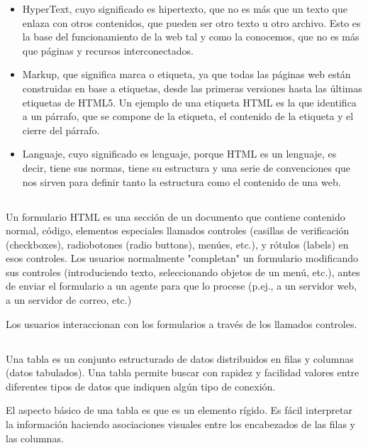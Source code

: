 \documentclass[10pt,a4paper]{article}
\begin{document}
\begin{itemize}
	\item  HyperText, cuyo significado es hipertexto, que no es más que un texto que enlaza con otros contenidos, que pueden ser otro texto u otro archivo. Esto es la base del funcionamiento de la web tal y como la conocemos, que no es más que páginas y recursos interconectados.
	\item  Markup, que significa marca o etiqueta, ya que todas las páginas web están construidas en base a etiquetas, desde las primeras versiones hasta las últimas etiquetas de HTML5. Un ejemplo de una etiqueta HTML es la que identifica a un párrafo, que se compone de la etiqueta, el contenido de la etiqueta y el cierre del párrafo.
	\item Languaje, cuyo significado es lenguaje, porque HTML es un lenguaje, es decir, tiene sus normas, tiene su estructura y una serie de convenciones que nos sirven para definir tanto la estructura como el contenido de una web.
	
\end{itemize}

\subsection{ \color{colorESCOM}{Formularios}}
Un formulario HTML es una sección de un documento que contiene contenido normal, código, elementos especiales llamados controles (casillas de verificación (checkboxes), radiobotones (radio buttons), menúes, etc.), y rótulos (labels) en esos controles. Los usuarios normalmente "completan" un formulario modificando sus controles (introduciendo texto, seleccionando objetos de un menú, etc.), antes de enviar el formulario a un agente para que lo procese (p.ej., a un servidor web, a un servidor de correo, etc.)

Los usuarios interaccionan con los formularios a través de los llamados controles.

\subsection{ \color{colorESCOM}{Tablas}}
Una tabla es un conjunto estructurado de datos distribuidos en filas y columnas (datos tabulados). Una tabla permite buscar con rapidez y facilidad valores entre diferentes tipos de datos que indiquen algún tipo de conexión.

El aspecto básico de una tabla es que es un elemento rígido. Es fácil interpretar la información haciendo asociaciones visuales entre los encabezados de las filas y las columnas.
\end{document}

